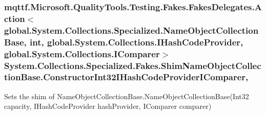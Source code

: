 \hypertarget{class_system_1_1_collections_1_1_specialized_1_1_fakes_1_1_shim_name_object_collection_base_ae2684c306d847e9e06b21fdc95467955}{
\subsubsection[{Constructor\-Int32\-I\-Hash\-Code\-Provider\-I\-Comparer}]{\setlength{\rightskip}{0pt plus 5cm}mqttf.\-Microsoft.\-Quality\-Tools.\-Testing.\-Fakes.\-Fakes\-Delegates.\-Action$<$global.\-System.\-Collections.\-Specialized.\-Name\-Object\-Collection\-Base, int, global.\-System.\-Collections.\-I\-Hash\-Code\-Provider, global.\-System.\-Collections.\-I\-Comparer$>$ System.\-Collections.\-Specialized.\-Fakes.\-Shim\-Name\-Object\-Collection\-Base.\-Constructor\-Int32\-I\-Hash\-Code\-Provider\-I\-Comparer\hspace{0.3cm}{\ttfamily [static]}, {\ttfamily [set]}}}\label{class_system_1_1_collections_1_1_specialized_1_1_fakes_1_1_shim_name_object_collection_base_ae2684c306d847e9e06b21fdc95467955}


Sets the shim of Name\-Object\-Collection\-Base.\-Name\-Object\-Collection\-Base(\-Int32 capacity, I\-Hash\-Code\-Provider hash\-Provider, I\-Comparer comparer)

